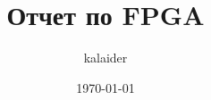\def\usetitle{}
\def\usegraphics{}



\title{Отчет по FPGA}
\def\subtitle{....}
\def\edition{[reports]\ \#\ 1}
\author{kalaider}
\date{\today}


	
	\ifdefined\usetitle
	    
	\fi
	
	

